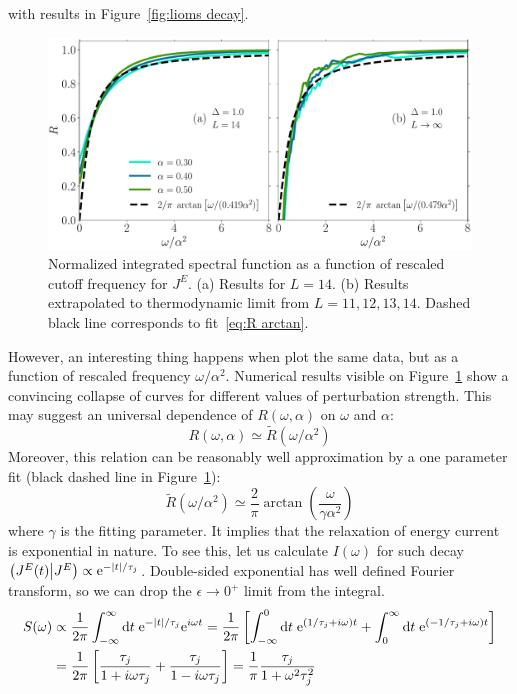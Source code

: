 with results in Figure~\ref{fig:lioms decay}.
\begin{figure}[ht]
  \centering
  \includegraphics[width=\figsize\textwidth]{Figures/current_scaling.pdf}
  \caption{Normalized integrated spectral function as a function of rescaled cutoff frequency for \(J^E\).
  (a) Results for \(L=14\). (b) Results extrapolated to thermodynamic limit from \(L=11,12,13,14\).
  Dashed black line corresponds to fit~\eqref{eq:R arctan}.}
  \label{fig:current decay scaling}
\end{figure}
However, an interesting thing happens when plot the same data, but as a function of rescaled
frequency \(\omega/\alpha^2\). Numerical results visible on Figure~\ref{fig:current decay scaling}
show a convincing collapse of curves for different values of perturbation strength. This may suggest
an universal dependence of \(R(\omega,\alpha)\) on \(\omega\) and \(\alpha\):
\begin{equation}
  R(\omega,\alpha)\simeq \tilde{R}(\omega/\alpha^2)
  \label{eq:universal scaling current}
\end{equation}
Moreover, this relation can be reasonably well approximation by a one parameter fit
(black dashed line in Figure~\ref{fig:current decay scaling}):
\begin{equation}
  \tilde{R}(\omega/\alpha^2) \simeq \frac{2}{\pi} \arctan\left(\frac{\omega}{\gamma \alpha^2}\right)
\label{eq:R arctan}
\end{equation}
where \(\gamma \) is the fitting parameter. It implies that the relaxation of energy current
is exponential in nature. To see this, let us calculate \(I(\omega)\) for such decay
\(\left(J^E(t) \middle| J^E\right) \propto \mathrm{e}^{-\abs{t}/\tau_{j}}\). Double-sided exponential has well defined Fourier
transform, so we can drop the \(\epsilon \to 0^{+}\) limit from the integral.
\begin{align}
  S(\omega) &\propto \frac{1}{2\pi} \int_{-\infty}^{\infty} \mathrm{d} t\; \mathrm{e}^{-\abs{t}/\tau_{j}} \mathrm{e}^{i \omega t} = 
  \frac{1}{2\pi} \left[\int_{-\infty}^{0} \mathrm{d} t\; \mathrm{e}^{(1/\tau_{j} + i\omega)t }
  + \int_{0}^{\infty} \mathrm{d} t\; \mathrm{e}^{(-1/\tau_{j} + i\omega)t }  \right] \nonumber \\
  &= \frac{1}{2\pi} \left[\frac{\tau_{j}}{1+i\omega \tau_{j}} + \frac{\tau_{j}}{1-i\omega\tau_{j}}\right] = 
  \frac{1}{\pi} \frac{\tau_{j}}{1+\omega^2\tau_{j}^2}
\end{align}
